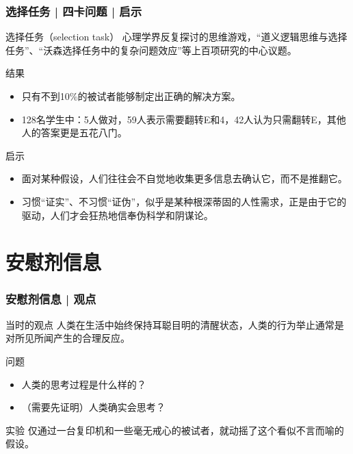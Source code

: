 \begin{frame}
  \frametitle{选择任务 | 四卡问题 | 启示}
  \begin{block}{选择任务（selection task）}
 心理学界反复探讨的思维游戏，“道义逻辑思维与选择任务”、“沃森选择任务中的复杂问题效应”等上百项研究的中心议题。
  \end{block}
  \pause
  \begin{block}{结果}
    \begin{itemize}
      \item 只有不到10\%的被试者能够制定出正确的解决方案。
      \item 128名学生中：5人做对，59人表示需要翻转E和4，42人认为只需翻转E，其他人的答案更是五花八门。
    \end{itemize}
  \end{block}
  \pause
  \begin{block}{启示}
    \begin{itemize}
      \item 面对某种假设，人们往往会不自觉地收集更多信息去确认它，而不是推翻它。
      \item \alert{习惯“证实”、不习惯“证伪”，似乎是某种根深蒂固的人性需求}，正是由于它的驱动，人们才会狂热地信奉伪科学和阴谋论。
    \end{itemize}
  \end{block}
\end{frame}

\section{安慰剂信息}
\begin{frame}
  \frametitle{安慰剂信息 | 观点}
  \begin{block}{当时的观点}
    人类在生活中始终保持耳聪目明的清醒状态，人类的行为举止通常是对所见所闻产生的合理反应。
  \end{block}
  \pause
  \begin{block}{问题}
    \begin{itemize}
      \item 人类的思考过程是什么样的？
      \item （需要先证明）人类确实会思考？
    \end{itemize}
  \end{block}
  \pause
  \begin{block}{实验}
    仅通过一台复印机和一些毫无戒心的被试者，就动摇了这个看似不言而喻的假设。
  \end{block}
\end{frame}

